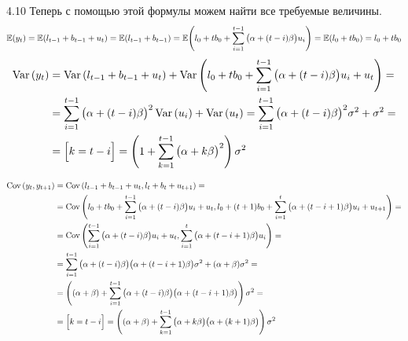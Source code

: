 \begin{solution}{{4.10}}
Теперь с помощью этой формулы можем найти все требуемые величины.
\[
    \mathbb{E}{\left(y_t\right)} = \mathbb{E}{\left(l_{t-1} + b_{t-1} + u_t\right)} = \mathbb{E}{\left(l_{t-1} + b_{t-1}\right)} = \mathbb{E}{\left(l_0 + t b_0 + \sum_{i = 1}^{t-1} \big(\alpha + (t - i)\beta\big) u_i\right)} = \mathbb{E}{\left(l_0 + t b_0\right)} = l_0 + tb_0 \\
\]
\begin{align*}
    \operatorname{Var}{\left(y_t\right)} &= \operatorname{Var}{\left(l_{t-1} + b_{t-1} + u_t\right)} + \operatorname{Var}{\left(l_0 + t b_0 + \sum_{i = 1}^{t-1} \big(\alpha + (t - i)\beta\big) u_i + u_t\right)} = \\
    &= \sum_{i = 1}^{t-1}\big(\alpha + (t - i)\beta\big)^2 \operatorname{Var}{\left( u_i \right)} + \operatorname{Var}{\left(u_t\right)} = \sum_{i = 1}^{t-1}\big(\alpha + (t - i)\beta\big)^2 \sigma^2 + \sigma^2 = \\
    &= \Big[k = t - i\Big]= \left( 1 + \sum_{k = 1}^{t-1}\big(\alpha + k\beta\big)^2 \right)\sigma^2 \\
\end{align*}

\begin{align*}
    \operatorname{Cov}{\left(y_t, y_{t+1}\right)} &= \operatorname{Cov}{\left(l_{t-1} + b_{t-1} + u_t, l_{t} + b_{t} + u_{t+1}\right)} = \\
    &= \operatorname{Cov}{\left(l_0 + t b_0 + \sum_{i = 1}^{t-1} \big(\alpha + (t - i)\beta\big) u_i + u_t, l_0 + (t+1) b_0 + \sum_{i = 1}^{t} \big(\alpha + (t - i + 1)\beta\big) u_i + u_{t+1}\right)} = \\
    &= \operatorname{Cov}{\left(\sum_{i = 1}^{t-1} \big(\alpha + (t - i)\beta\big) u_i + u_t, \sum_{i = 1}^{t} \big(\alpha + (t - i + 1)\beta\big) u_i\right)} = \\
    &= \sum_{i = 1}^{t-1} \big(\alpha + (t - i)\beta\big)\big(\alpha + (t - i + 1)\beta\big) \sigma^2 + (\alpha + \beta) \sigma^2 = \\
    &= \left( (\alpha + \beta) + \sum_{i = 1}^{t-1} \big(\alpha + (t - i)\beta\big)\big(\alpha + (t - i + 1)\beta\big) \right)\sigma^2 = \\
    &= \Big[k = t - i\Big]= \left( (\alpha + \beta) + \sum_{k = 1}^{t-1} \big(\alpha + k\beta\big)\big(\alpha + (k + 1)\beta\big) \right)\sigma^2
\end{align*}

\end{solution}
\protect \hypertarget {soln:4.11}{}
